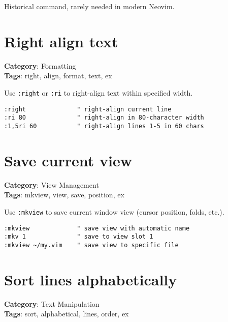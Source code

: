 {{{{{Historical command, rarely needed in modern Neovim.

\section{Right align text}

\textbf{Category}: Formatting\\ \textbf{Tags}: right, align, format, text, ex
\vspace{0.5cm}

Use {\footnotesize \Verb§:right§} or {\footnotesize \Verb§:ri§} to right-align text within specified width.

\begin{Exa*}{}
\begin{Verbatim}[fontsize=\footnotesize, breaklines, breakanywhere]
:right              " right-align current line
:ri 80              " right-align in 80-character width
:1,5ri 60           " right-align lines 1-5 in 60 chars
\end{Verbatim}
\end{Exa*}

\section{Save current view}

\textbf{Category}: View Management\\ \textbf{Tags}: mkview, view, save, position, ex
\vspace{0.5cm}

Use {\footnotesize \Verb§:mkview§} to save current window view (cursor position, folds, etc.).

\begin{Exa*}{}
\begin{Verbatim}[fontsize=\footnotesize, breaklines, breakanywhere]
:mkview             " save view with automatic name
:mkv 1              " save to view slot 1
:mkview ~/my.vim    " save view to specific file
\end{Verbatim}
\end{Exa*}

\section{Sort lines alphabetically}

\textbf{Category}: Text Manipulation\\ \textbf{Tags}: sort, alphabetical, lines, order, ex
\vspace{0.5cm}

}}}}}
